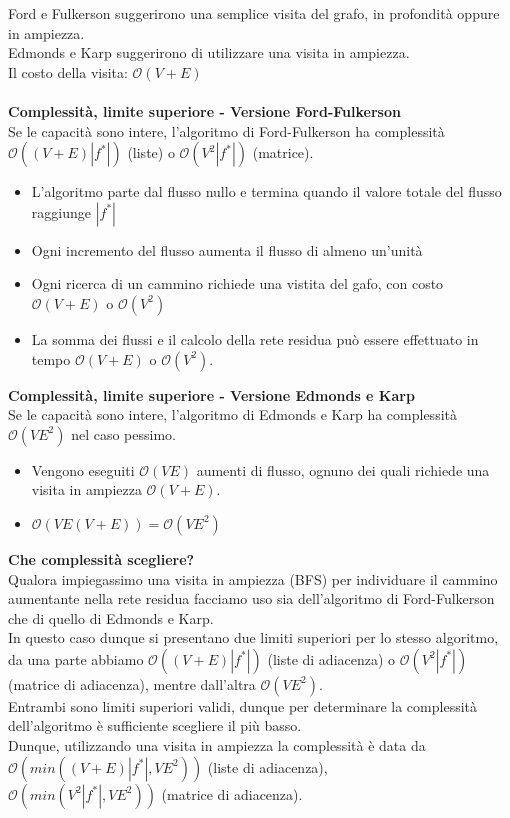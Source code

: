 \documentclass[../cheatSheetAlgoritmi.tex]{subfiles}
\begin{document}
Ford e Fulkerson suggerirono una semplice visita del grafo, in profondità oppure in ampiezza. \\Edmonds e Karp suggerirono di utilizzare una visita in ampiezza. \\
Il costo della visita: $\mathcal{O}(V + E)$ \\\\
\textbf{Complessità, limite superiore - Versione Ford-Fulkerson} \\
Se le capacità sono intere, l'algoritmo di Ford-Fulkerson ha complessità $\mathcal{O}((V + E)|f^{*}|)$ (liste) o $\mathcal{O}(V^2 |f^*|)$ (matrice).
\begin{itemize}
	\item L'algoritmo parte dal flusso nullo e termina quando il valore totale del flusso raggiunge $|f^*|$
	\item Ogni incremento del flusso aumenta il flusso di almeno un'unità
	\item Ogni ricerca di un cammino richiede una vistita del gafo, con costo $\mathcal{O}(V + E)$ o $\mathcal{O}(V^2)$
	\item La somma dei flussi e il calcolo della rete residua può essere effettuato in tempo $\mathcal{O}(V + E) $ o $\mathcal{O}(V^2)$.
\end{itemize}
\textbf{Complessità, limite superiore - Versione Edmonds e Karp} \\
Se le capacità sono intere, l'algoritmo di Edmonds e Karp ha complessità $\mathcal{O}(VE^2)$ nel caso pessimo. 
\begin{itemize}
	\item Vengono eseguiti $\mathcal{O}(VE)$ aumenti di flusso, ognuno dei quali richiede una visita in ampiezza $\mathcal{O}(V + E)$.
	\item $\mathcal{O}(VE(V + E)) = \mathcal{O}(VE^2)$
\end{itemize}
\textbf{Che complessità scegliere?}\\
Qualora impiegassimo una visita in ampiezza (BFS) per individuare il cammino aumentante nella rete residua facciamo uso sia dell'algoritmo di Ford-Fulkerson che di quello di Edmonds e Karp. \\
In questo caso dunque si presentano due limiti superiori per lo stesso algoritmo, da una parte abbiamo $\mathcal{O}((V + E)|f^{*}|)$ (liste di adiacenza) o $\mathcal{O}(V^2 |f^*|)$ (matrice di adiacenza), mentre dall'altra  $\mathcal{O}(VE^2)$.\\
Entrambi sono limiti superiori validi, dunque per determinare la complessità dell'algoritmo è sufficiente scegliere il più basso. \\
Dunque, utilizzando una visita in ampiezza la complessità è data da $\mathcal{O}(min((V + E)|f^{*}|, VE^2))$ (liste di adiacenza),\\ $\mathcal{O}(min(V^2|f^{*}|, VE^2))$ (matrice di adiacenza).
\end{document}
